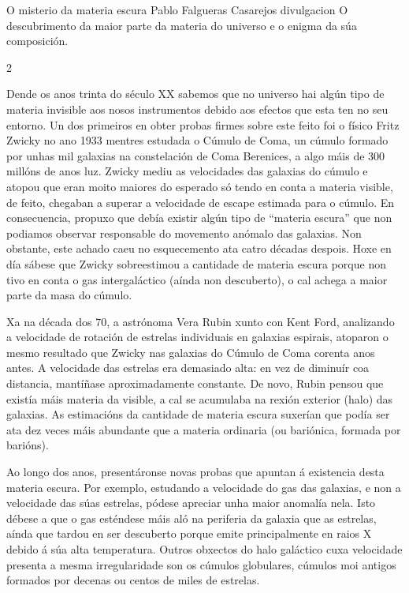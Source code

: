 \Titular%
{O misterio da materia escura}%
{Pablo Falgueras Casarejos}%
{divulgacion}%
{O descubrimento da maior parte da materia do universo e o enigma da súa composición.}%


\begin{refsection}
\begin{multicols}{2}


Dende os anos trinta do século XX sabemos que no universo hai algún tipo de
materia invisible aos nosos instrumentos debido aos efectos que esta ten no seu
entorno. Un dos primeiros en obter probas firmes sobre este feito foi o físico
Fritz Zwicky no ano 1933 mentres estudada o Cúmulo de Coma, un cúmulo formado
por unhas mil galaxias na constelación de Coma Berenices, a algo máis de 300
millóns de anos luz. Zwicky mediu as velocidades das galaxias do cúmulo e
atopou que eran moito maiores do esperado só tendo en conta a materia visible,
de feito, chegaban a superar a velocidade de escape estimada para o cúmulo. En
consecuencia, propuxo que debía existir algún tipo de “materia escura” que non
podiamos observar responsable do movemento anómalo das galaxias. Non obstante,
este achado caeu no esquecemento ata catro décadas despois. Hoxe en día sábese
que Zwicky sobreestimou a cantidade de materia escura porque non tivo en conta
o gas intergaláctico (aínda non descuberto), o cal achega a maior parte da masa
do cúmulo.

Xa na década dos 70, a astrónoma Vera Rubin xunto con Kent Ford, analizando a
velocidade de rotación de estrelas individuais en galaxias espirais, atoparon o
mesmo resultado que Zwicky nas galaxias do Cúmulo de Coma corenta anos antes. A
velocidade das estrelas era demasiado alta: en vez de diminuír coa distancia,
mantíñase aproximadamente constante. De novo, Rubin pensou que existía máis
materia da visible, a cal se acumulaba na rexión exterior (halo) das galaxias.
As estimacións da cantidade de materia escura suxerían que podía ser ata dez
veces máis abundante que a materia ordinaria (ou bariónica, formada por
barións).

Ao longo dos anos, presentáronse novas probas que apuntan á existencia desta
materia escura. Por exemplo, estudando a velocidade do gas das galaxias, e non
a velocidade das súas estrelas, pódese apreciar unha maior anomalía nela. Isto
débese a que o gas esténdese máis aló na periferia da galaxia que as estrelas,
aínda que tardou en ser descuberto porque emite principalmente en raios X
debido á súa alta temperatura. Outros obxectos do halo galáctico cuxa
velocidade presenta a mesma irregularidade son os cúmulos globulares, cúmulos
moi antigos formados por decenas ou centos de miles de estrelas.


\end{multicols}
\end{refsection}
